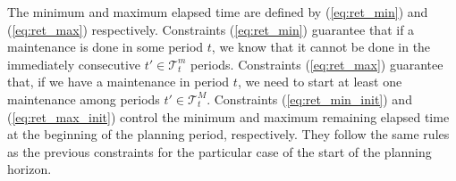 \documentclass[a4paper,onecolumn,fleqn]{article}
\begin{document}
    The minimum and maximum elapsed time are defined by (\ref{eq:ret_min}) and (\ref{eq:ret_max}) respectively. Constraints (\ref{eq:ret_min}) guarantee that if a maintenance is done in some period $t$, we know that it cannot be done in the immediately consecutive $t' \in \mathcal{T}^{m}_t$ periods. Constraints (\ref{eq:ret_max}) guarantee that, if we have a maintenance in period $t$, we need to start at least one maintenance among periods $t' \in \mathcal{T}^{M}_t$. Constraints (\ref{eq:ret_min_init}) and (\ref{eq:ret_max_init}) control the minimum and maximum remaining elapsed time at the beginning of the planning period, respectively. They follow the same rules as the previous constraints for the particular case of the start of the planning horizon.

\end{document}
